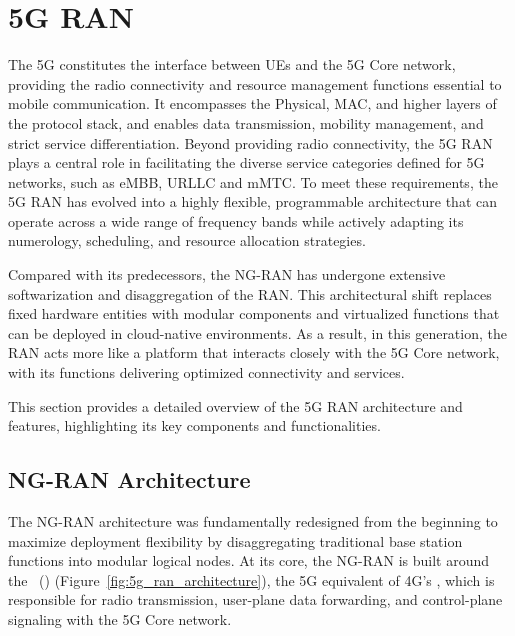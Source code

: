 \section{5G RAN}
\label{sec:5g_ran}
The 5G  constitutes the interface between \glspl{UE} and the 5G Core network, providing the radio connectivity and resource management functions essential to mobile communication. It encompasses the Physical, \gls{MAC}, and higher layers of the protocol stack, and enables data transmission, mobility management, and strict service differentiation.
Beyond providing radio connectivity, the 5G \gls{RAN} plays a central role in facilitating the diverse service categories defined for 5G networks, such as \gls{eMBB}, \gls{URLLC} and \gls{mMTC}. To meet these requirements, the 5G \gls{RAN} has evolved into a highly flexible, programmable architecture that can operate across a wide range of frequency bands while actively adapting its numerology, scheduling, and resource allocation strategies.

Compared with its predecessors, the \gls{NG-RAN} has undergone extensive softwarization and disaggregation of the \gls{RAN}. This architectural shift replaces fixed hardware entities with modular components and virtualized functions that can be deployed in cloud-native environments. As a result, in this generation, the \gls{RAN} acts more like a platform that interacts closely with the 5G Core network, with its functions delivering optimized connectivity and services.

This section provides a detailed overview of the 5G \gls{RAN} architecture and features, highlighting its key components and functionalities.

\subsection{\gls{NG-RAN} Architecture}
\label{sec:ran_architecture}

The \gls{NG-RAN} architecture was fundamentally redesigned from the beginning to maximize deployment flexibility by disaggregating traditional base station functions into modular logical nodes. At its core, the \gls{NG-RAN} is built around the ~() (Figure~\ref{fig:5g_ran_architecture}), the 5G equivalent of 4G's , which is responsible for radio transmission, user-plane data forwarding, and control-plane signaling with the 5G Core network.

